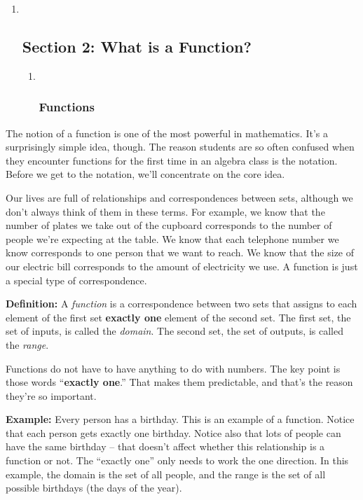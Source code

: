 \begin{enumerate}
\item ~
  \hypertarget{section-2-what-is-a-function}{\subsection{Section 2: What
  is a Function? }\label{section-2-what-is-a-function}}

  \begin{enumerate}
  \item ~
    \subsubsection{Functions}\label{functions}
  \end{enumerate}
\end{enumerate}

The notion of a function is one of the most powerful in mathematics.
It's a surprisingly simple idea, though. The reason students are so
often confused when they encounter functions for the first time in an
algebra class is the notation. Before we get to the notation, we'll
concentrate on the core idea.

Our lives are full of relationships and correspondences between sets,
although we don't always think of them in these terms. For example, we
know that the number of plates we take out of the cupboard corresponds
to the number of people we're expecting at the table. We know that each
telephone number we know corresponds to one person that we want to
reach. We know that the size of our electric bill corresponds to the
amount of electricity we use. A function is just a special type of
correspondence.

\textbf{Definition:} A \emph{function} is a correspondence between two
sets that assigns to each element of the first set \textbf{exactly one}
element of the second set. The first set, the set of inputs, is called
the \emph{domain}. The second set, the set of outputs, is called the
\emph{range}.

Functions do not have to have anything to do with numbers. The key point
is those words ``\textbf{exactly one}.'' That makes them predictable,
and that's the reason they're so important.

\textbf{Example:} Every person has a birthday. This is an example of a
function. Notice that each person gets exactly one birthday. Notice also
that lots of people can have the same birthday -- that doesn't affect
whether this relationship is a function or not. The ``exactly one'' only
needs to work the one direction. In this example, the domain is the set
of all people, and the range is the set of all possible birthdays (the
days of the year).


